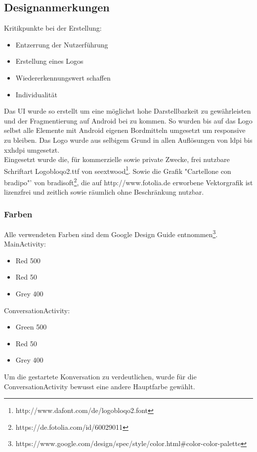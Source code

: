 	\subsection{Designanmerkungen}\label{design}
	
	Kritikpunkte bei der Erstellung:
	\begin{itemize}\itemsep0pt
	\item Entzerrung der Nutzerführung
	\item Erstellung eines Logos
	\item Wiedererkennungswert schaffen
	\item Individualität\\
	\end{itemize}
	Das UI wurde so erstellt um eine möglichst hohe Darstellbarkeit zu gewährleisten und der Fragmentierung auf Android bei zu kommen. So wurden bis auf das Logo selbst alle Elemente mit Android eigenen Bordmitteln umgesetzt um responsive zu bleiben. Das Logo wurde aus selbigem Grund in allen Auflösungen von ldpi bis xxhdpi umgesetzt.\\
	Eingesetzt wurde die, für kommerzielle sowie private Zwecke, frei nutzbare Schriftart Logobloqo2.ttf von seextwood\footnote{\label{foot:1}http://www.dafont.com/de/logobloqo2.font}. Sowie die Grafik "Cartellone con bradipo"' von bradisoft\footnote{\label{foot:2}https://de.fotolia.com/id/60029011}, die auf http://www.fotolia.de erworbene Vektorgrafik ist lizenzfrei und zeitlich sowie räumlich ohne Beschränkung nutzbar.\\
	
	\subsubsection{Farben}\label{farben}
		
		Alle verwendeten Farben sind dem Google Design Guide entnommen\footnote{\label{foot:3}https://www.google.com/design/spec/style/color.html\#color-color-palette}.\\
		
	MainActivity:
		\begin{itemize}\itemsep0pt
			\item Red 500
			\item Red 50
			\item Grey 400
		\end{itemize}
	
	ConversationActivity:
		\begin{itemize}\itemsep0pt
			\item Green 500
			\item Red 50
			\item Grey 400\\
		\end{itemize}
	Um die gestartete Konversation zu verdeutlichen, wurde für die ConversationActivity bewusst eine andere Hauptfarbe gewählt.
	
